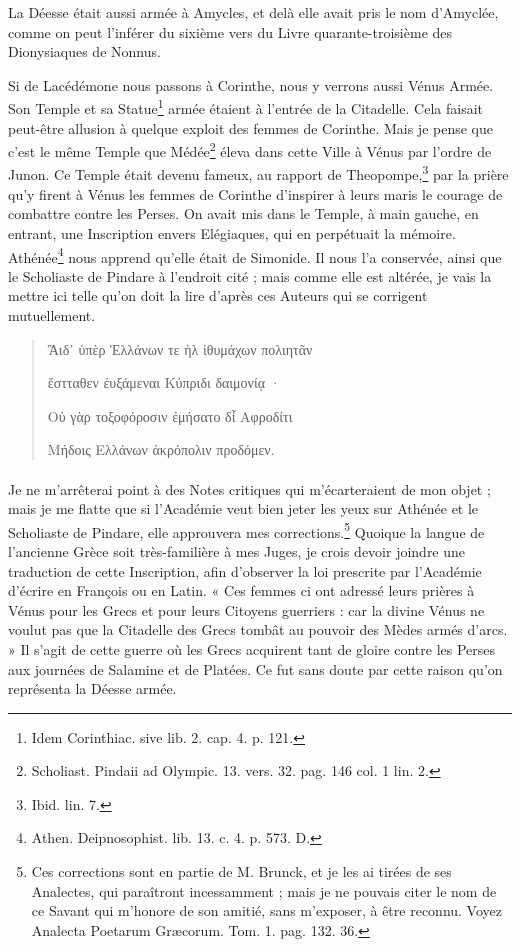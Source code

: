 \documentclass[a4paper, 11pt, oneside, polutonikogreek, french]{article}
\begin{document}
La Déesse était aussi armée à Amycles, et delà elle avait pris le nom d'Amyclée, comme on peut l'inférer du sixième vers du Livre quarante-troisième des Dionysiaques de Nonnus.

Si de Lacédémone nous passons à Corinthe, nous y verrons aussi Vénus Armée. Son Temple et sa Statue\footnote{Idem Corinthiac. sive lib. 2. cap. 4. p. 121.} armée étaient à l'entrée de la Citadelle. Cela faisait peut-être allusion à quelque exploit des femmes de Corinthe. Mais je pense que c'est le même Temple que Médée\footnote{Scholiast. Pindaii ad Olympic. 13. vers. 32. pag. 146 col. 1 lin. 2.} éleva dans cette Ville à Vénus par l'ordre de Junon. Ce Temple était devenu fameux, au rapport de Theopompe,\footnote{Ibid. lin. 7.} par la prière qu'y firent à Vénus les femmes de Corinthe d'inspirer à leurs maris le courage de combattre contre les Perses. On avait mis dans le Temple, à main gauche, en entrant, une Inscription envers Elégiaques, qui en perpétuait la mémoire. Athénée\footnote{Athen. Deipnosophist. lib. 13. c. 4. p. 573. D.} nous apprend qu'elle était de Simonide. Il nous l'a conservée, ainsi que le Scholiaste de Pindare à l'endroit cité ; mais comme elle est altérée, je vais la mettre ici telle qu'on doit la lire d'après ces Auteurs qui se corrigent mutuellement.
\begin{quotation}
Ἃιδ᾽ ὑπὲρ Ἑλλάνων τε ὴλ ἰθυμάχων πολιητᾶν

\hspace*{5mm}ἔστταθεν ἐυξάμεναι Κύπριδι δαιμονίᾳ ·

Οὐ γὰρ τοξοφόροσιν ἐμήσατο δἶ Αφροδίτι

\hspace*{5mm}Μήδοις Ελλάνων ἀκρόπολιν προδόμεν.    
\end{quotation}
\paragraph{}
Je ne m'arrêterai point à des Notes critiques qui m'écarteraient de mon objet ; mais je me flatte que si l'Académie veut bien jeter les yeux sur Athénée et le Scholiaste de Pindare, elle approuvera mes corrections.\footnote{Ces corrections sont en partie de M. Brunck, et je les ai tirées de ses Analectes, qui paraîtront incessamment ; mais je ne pouvais citer le nom de ce Savant qui m'honore de son amitié, sans m'exposer, à être reconnu. Voyez Analecta Poetarum Græcorum. Tom. 1. pag. 132. 36.} Quoique la langue de l'ancienne Grèce soit très-familière à mes Juges, je crois devoir joindre une traduction de cette Inscription, afin d'observer la loi prescrite par l'Académie d'écrire en François ou en Latin. « Ces femmes ci ont adressé leurs prières à Vénus pour les Grecs et pour leurs Citoyens guerriers : car la divine Vénus ne voulut pas que la Citadelle des Grecs tombât au pouvoir des Mèdes armés d'arcs. » Il s'agit de cette guerre où les Grecs acquirent tant de gloire contre les Perses aux journées de Salamine et de Platées. Ce fut sans doute par cette raison qu'on représenta la Déesse armée.
\end{document}
